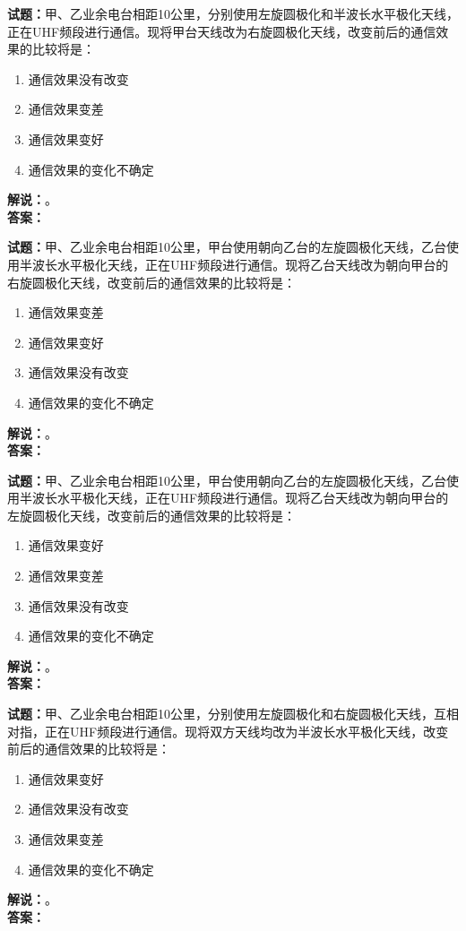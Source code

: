 \documentclass{ctexbook}
\begin{document}
\bigskip

\noindent\textbf{试题：}甲、乙业余电台相距10公里，分别使用左旋圆极化和半波长水平极化天线，正在UHF频段进行通信。现将甲台天线改为右旋圆极化天线，改变前后的通信效果的比较将是：
\begin{enumerate}[leftmargin=3em]
  \item 通信效果没有改变
  \item 通信效果变差
  \item 通信效果变好
  \item 通信效果的变化不确定
\end{enumerate}
\noindent\textbf{解说：}\textbf{}。\\\noindent\textbf{答案：}

\bigskip

\noindent\textbf{试题：}甲、乙业余电台相距10公里，甲台使用朝向乙台的左旋圆极化天线，乙台使用半波长水平极化天线，正在UHF频段进行通信。现将乙台天线改为朝向甲台的右旋圆极化天线，改变前后的通信效果的比较将是：
\begin{enumerate}[leftmargin=3em]
  \item 通信效果变差
  \item 通信效果变好
  \item 通信效果没有改变
  \item 通信效果的变化不确定
\end{enumerate}
\noindent\textbf{解说：}\textbf{}。\\\noindent\textbf{答案：}

\bigskip

\noindent\textbf{试题：}甲、乙业余电台相距10公里，甲台使用朝向乙台的左旋圆极化天线，乙台使用半波长水平极化天线，正在UHF频段进行通信。现将乙台天线改为朝向甲台的左旋圆极化天线，改变前后的通信效果的比较将是：
\begin{enumerate}[leftmargin=3em]
  \item 通信效果变好
  \item 通信效果变差
  \item 通信效果没有改变
  \item 通信效果的变化不确定
\end{enumerate}
\noindent\textbf{解说：}\textbf{}。\\\noindent\textbf{答案：}

\bigskip

\noindent\textbf{试题：}甲、乙业余电台相距10公里，分别使用左旋圆极化和右旋圆极化天线，互相对指，正在UHF频段进行通信。现将双方天线均改为半波长水平极化天线，改变前后的通信效果的比较将是：
\begin{enumerate}[leftmargin=3em]
  \item 通信效果变好
  \item 通信效果没有改变
  \item 通信效果变差
  \item 通信效果的变化不确定
\end{enumerate}
\noindent\textbf{解说：}\textbf{}。\\\noindent\textbf{答案：}
\end{document}
